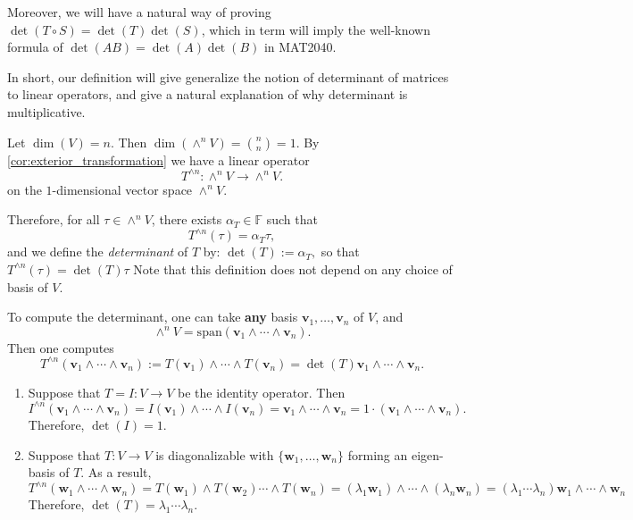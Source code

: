 Moreover, we will have a natural way of proving 
$\det(T \circ S) = \det(T) \det(S)$, which in term will imply the well-known formula of $\det(AB) = \det(A) \det(B)$ in MAT2040.

In short, our definition will give generalize the notion of determinant of matrices to linear operators, and give a natural explanation of why determinant is multiplicative.

\begin{definition} Let $\dim(V) = n$. Then
\( \dim(\wedge^n V) = \binom{n}{n} = 1.\)
By \autoref{cor:exterior_transformation} we have a linear operator 
$$T^{\wedge n} : \wedge^n V \to \wedge^n V.$$
on the $1$-dimensional vector space $\wedge^n V$.

Therefore, for all $\tau \in \wedge^n V$, there exists $\alpha_T \in \mathbb{F}$ such that
\[T^{\wedge n}(\tau) = \alpha_T \tau,\]
and we define the \emph{determinant} of $T$ by:
\(\det(T) := \alpha_T,\) so that
$T^{\wedge n}(\tau) = \det(T) \tau $
Note that this definition does not depend on any choice of basis of $V$.
\end{definition}

To compute the determinant, one can take {\bf any} basis ${\mathbf{v}_1, \dots, \mathbf{v}_n}$ of $V$, and
\[ \wedge^n V = \mathrm{span}(\mathbf{v}_1 \wedge \cdots \wedge \mathbf{v}_n).\] 
Then one computes
$$T^{\wedge n}(\mathbf{v}_1 \wedge \cdots \wedge \mathbf{v}_n) := T(\mathbf{v}_1) \wedge \cdots \wedge T(\mathbf{v}_n) = \det(T) \mathbf{v}_1 \wedge \cdots \wedge \mathbf{v}_n.$$

\begin{example}
\begin{enumerate}
    \item Suppose that $T = I : V \to V$ be the identity operator. Then
\[
I^{\wedge n}(\mathbf{v}_1 \wedge \cdots \wedge \mathbf{v}_n) = I(\mathbf{v}_1) \wedge \cdots \wedge I(\mathbf{v}_n) = \mathbf{v}_1 \wedge \cdots \wedge \mathbf{v}_n = 1 \cdot (\mathbf{v}_1 \wedge \cdots \wedge \mathbf{v}_n).
\]
Therefore, $\det(I) = 1$.

\item Suppose that $T : V \to V$ is diagonalizable with $\{\mathbf{w}_1, \dots, \mathbf{w}_n\}$ forming an eigen-basis of $T$. As a result,
\[
T^{\wedge n}(\mathbf{w}_1 \wedge \cdots \wedge \mathbf{w}_n) = T(\mathbf{w}_1) \wedge T(\mathbf{w}_2) \cdots \wedge T(\mathbf{w}_n) 
=(\lambda_1 \mathbf{w}_1) \wedge \cdots \wedge (\lambda_n \mathbf{w}_n) = (\lambda_1 \cdots \lambda_n)\mathbf{w}_1 \wedge \cdots \wedge \mathbf{w}_n
\]
Therefore, $\det(T) = \lambda_1 \cdots \lambda_n$.
\end{enumerate}
\end{example}

